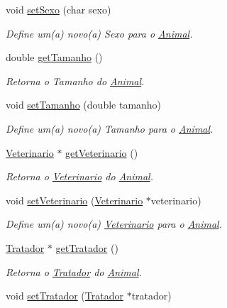 \begin{DoxyCompactItemize}
void \hyperlink{classAnimal_aab32d5ad6689a4e19cfd43a303c939af}{set\+Sexo} (char sexo)
\begin{DoxyCompactList}\small\item\em Define um(a) novo(a) Sexo para o \hyperlink{classAnimal}{Animal}. \end{DoxyCompactList}\item 
double \hyperlink{classAnimal_a3936ff4ad07fee3173db2a9dff52c706}{get\+Tamanho} ()
\begin{DoxyCompactList}\small\item\em Retorna o Tamanho do \hyperlink{classAnimal}{Animal}. \end{DoxyCompactList}\item 
void \hyperlink{classAnimal_a53daf7711c6b6430c723647b2cec7c36}{set\+Tamanho} (double tamanho)
\begin{DoxyCompactList}\small\item\em Define um(a) novo(a) Tamanho para o \hyperlink{classAnimal}{Animal}. \end{DoxyCompactList}\item 
\hyperlink{classVeterinario}{Veterinario} $\ast$ \hyperlink{classAnimal_a2c8aacd4e6709ae559c4b17d6856a3df}{get\+Veterinario} ()
\begin{DoxyCompactList}\small\item\em Retorna o \hyperlink{classVeterinario}{Veterinario} do \hyperlink{classAnimal}{Animal}. \end{DoxyCompactList}\item 
void \hyperlink{classAnimal_ace9b58ea47057261292ce42a4edd2870}{set\+Veterinario} (\hyperlink{classVeterinario}{Veterinario} $\ast$veterinario)
\begin{DoxyCompactList}\small\item\em Define um(a) novo(a) \hyperlink{classVeterinario}{Veterinario} para o \hyperlink{classAnimal}{Animal}. \end{DoxyCompactList}\item 
\hyperlink{classTratador}{Tratador} $\ast$ \hyperlink{classAnimal_a386807706a0ba203fe84b68cd10c38aa}{get\+Tratador} ()
\begin{DoxyCompactList}\small\item\em Retorna o \hyperlink{classTratador}{Tratador} do \hyperlink{classAnimal}{Animal}. \end{DoxyCompactList}\item 
void \hyperlink{classAnimal_aec8cd2eec7a0c833074e303f389c8f9f}{set\+Tratador} (\hyperlink{classTratador}{Tratador} $\ast$tratador)

\end{DoxyCompactItemize}
